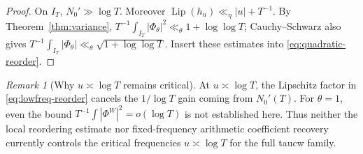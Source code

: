 \documentclass[11pt,leqno]{amsart}
\numberwithin{equation}{section}
\theoremstyle{definition}
\theoremstyle{remark}
\newtheorem{remark}[theorem]{Remark}
\newcommand{\1}{\mathbf 1}
\newcommand{\LP}{\operatorname{Lip}}
\begin{document}
\begin{proof}
On $I_T$, $N_0'\gg\log T$. Moreover $\LP(h_u)\ll_\eta |u|+T^{-1}$. By Theorem~\ref{thm:variance}, $T^{-1}\int_{I_T}|\Phi_\theta|^2\ll_\theta1+\log\log T$; Cauchy--Schwarz also gives $T^{-1}\int_{I_T}|\Phi_\theta|\ll_\theta\sqrt{1+\log\log T}$. Insert these estimates into \eqref{eq:quadratic-reorder}.
\end{proof}
\begin{remark}[Why $u\asymp\log T$ remains critical]
At $u\asymp\log T$, the Lipschitz factor in \eqref{eq:lowfreq-reorder} cancels the $1/\log T$ gain coming from $N_0'(T)$. For $\theta=1$, even the bound $T^{-1}\int|\Phi^W|^2=o(\log T)$ is not established here. Thus neither the local reordering estimate nor fixed-frequency arithmetic coefficient recovery currently controls the critical frequencies $u\asymp\log T$ for the full taucw family.
\end{remark}
\end{document}

